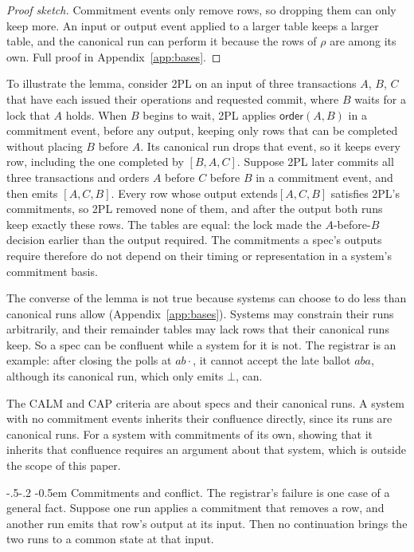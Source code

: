 \documentclass[sigconf]{cidr-2027}
\makeatletter
\theoremstyle{remark}
\renewcommand\paragraph{\@startsection{paragraph}{4}{\z@}%
  {-.5\baselineskip \@plus -2\p@ \@minus -.2\p@}%
  {-0.5em}%
  {\normalfont\bfseries}}
\newcommand{\commitment}{commitment\xspace}
\newcommand{\commitments}{commitments\xspace}
\newcommand{\Commitment}{Commitment\xspace}
\newcommand{\outrel}{extends\xspace}          %
\makeatother
\begin{document}
\color{blue!70!black}\begin{proof}[Proof sketch]
\Commitment events only remove rows, so dropping them can only keep more.  An
input or output event applied to a larger table keeps a larger table, and the
canonical run can perform it because the rows of $\rho$ are among its
own.  Full proof in
Appendix~\ref{app:bases}.\color{black}
\end{proof}

\color{blue!70!black}To illustrate the lemma, consider 2PL on an input of three transactions
$A$, $B$, $C$ that have each issued their operations and requested commit,
where $B$ waits for a lock that $A$ holds.  When $B$ begins to wait, 2PL applies
$\mathsf{order}(A,B)$ in a \commitment event, before any output, keeping only
rows that can be completed without placing $B$ before $A$.  Its canonical run
drops that event, so it keeps every row, including the one completed by
$[B,A,C]$.  Suppose 2PL later commits all three transactions and orders $A$
before $C$ before $B$ in a \commitment event, and then emits $[A,C,B]$.  Every
row whose output \outrel $[A,C,B]$ satisfies 2PL's \commitments, so 2PL
removed none of them, and after the output both runs keep exactly these rows.
The tables are equal: the lock made the $A$-before-$B$ decision
earlier than the output required.  The \commitments a spec's outputs require therefore do not depend on their
timing or representation in a system's \commitment basis.\color{black}

The converse of the lemma is not true because systems can choose to do less
than canonical runs allow (Appendix~\ref{app:bases}).  Systems may constrain their runs arbitrarily, and
their remainder tables may lack rows that their canonical runs keep.  So a spec
can be confluent while a system for it is not.  The registrar is an example:
after closing the polls at $ab\cdot$, it cannot accept the late ballot $aba$,
although its canonical run, which only emits $\bot$, can.

The CALM and CAP criteria are about specs and
their canonical runs.  A system with no \commitment events inherits their
confluence directly, since its runs are canonical runs.  For a system with
\commitments of its own, showing that it inherits that confluence requires an
argument about that system, which is outside the scope of this paper.

\paragraph{Commitments and conflict.}
The registrar's failure is one case of a general fact.  Suppose one run
applies a \commitment that removes a row, and another run emits that row's
output at its input.  Then no continuation brings the two runs to a common
state at that input.
\end{document}
